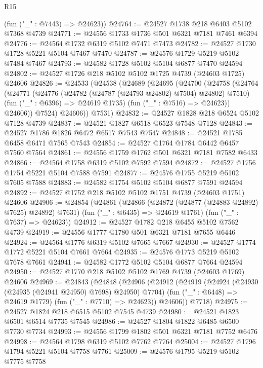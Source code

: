 \begin{lexlean}{R15}
\begin{coremodule}
{{{{{{{{{{{      (fun ("_" : @7443) => @24623))
@24764 := @24527 @1738 @218 @6403 @5102 @7368 @4739
@24771 := @24556 @1733 @1736 @501 @6321 @7181 @7461 @6394
@24776 := @24564 @1732 @6319 @5102 @7471 @7473
@24782 := @24527 @1730 @1728 @5221 @5104 @7467 @7470
@24787 := @24576 @1729 @5219 @5102 @7484 @7467
@24793 := @24582 @1728 @5102 @5104 @6877 @7470 @24594
@24802 := @24527 @1726 @218 @5102 @5102 @1725 @4739 (@24603 @1725) @24606
@24826 := @24533
    (@24538
      (@24689
        (@24695
          (@24700
            (@24758
              (@24764
                (@24771
                  (@24776 (@24782 (@24787 (@24793 @24802) @7504) @24802) @7510)
                  (fun ("_" : @6396) => @24619 @1735)
                  (fun ("_" : @7516) => @24623))
                @24606))
            @7524)
          @24606))
      @7531)
@24832 := @24527 @1828 @218 @6524 @5102 @7128 @4739
@24837 := @24521 @1827 @6518 @6523 @7548 @7128
@24843 := @24527 @1786 @1826 @6472 @6517 @7543 @7547
@24848 := @24521 @1785 @6458 @6471 @7565 @7543
@24854 := @24527 @1764 @1784 @6442 @6457 @7560 @7564
@24861 := @24556 @1759 @1762 @501 @6321 @7181 @7582 @6433
@24866 := @24564 @1758 @6319 @5102 @7592 @7594
@24872 := @24527 @1756 @1754 @5221 @5104 @7588 @7591
@24877 := @24576 @1755 @5219 @5102 @7605 @7588
@24883 := @24582 @1754 @5102 @5104 @6877 @7591 @24594
@24892 := @24527 @1752 @218 @5102 @5102 @1751 @4739 (@24603 @1751) @24606
@24906 := @24854
    (@24861
      (@24866 (@24872 (@24877 (@24883 @24892) @7625) @24892) @7631)
      (fun ("_" : @6435) => @24619 @1761)
      (fun ("_" : @7637) => @24623))
@24912 := @24527 @1782 @218 @6455 @5102 @7562 @4739
@24919 := @24556 @1777 @1780 @501 @6321 @7181 @7655 @6446
@24924 := @24564 @1776 @6319 @5102 @7665 @7667
@24930 := @24527 @1774 @1772 @5221 @5104 @7661 @7664
@24935 := @24576 @1773 @5219 @5102 @7678 @7661
@24941 := @24582 @1772 @5102 @5104 @6877 @7664 @24594
@24950 := @24527 @1770 @218 @5102 @5102 @1769 @4739 (@24603 @1769) @24606
@24969 := @24843
    (@24848
      (@24906
        (@24912
          (@24919
            (@24924 (@24930 (@24935 (@24941 @24950) @7698) @24950) @7704)
            (fun ("_" : @6448) => @24619 @1779)
            (fun ("_" : @7710) => @24623))
          @24606))
      @7718)
@24975 := @24527 @1824 @218 @6515 @5102 @7545 @4739
@24980 := @24521 @1823 @6501 @6514 @7735 @7545
@24986 := @24527 @1804 @1822 @6485 @6500 @7730 @7734
@24993 := @24556 @1799 @1802 @501 @6321 @7181 @7752 @6476
@24998 := @24564 @1798 @6319 @5102 @7762 @7764
@25004 := @24527 @1796 @1794 @5221 @5104 @7758 @7761
@25009 := @24576 @1795 @5219 @5102 @7775 @7758
}}}}}}}}}}}
\end{coremodule}
\end{lexlean}
